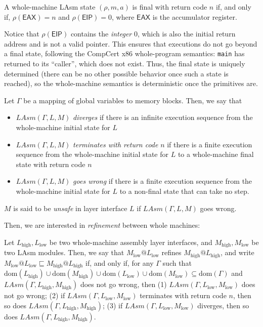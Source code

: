 \begin{definition}
A whole-machine LAsm state $(\rho, m, a)$ is final with return code
$n$ if, and only if, $\rho(\mathsf{EAX}) = n$ and $\rho(\mathsf{EIP}) =
0$, where $\mathsf{EAX}$ is the accumulator register.
\end{definition}

Notice that $\rho(\mathsf{EIP})$ contains the \emph{integer} 0,
which is also the initial return address and is not a valid pointer.
This ensures that executions do not
go beyond a final state, following the CompCert x86 whole-program
semantics: \texttt{main} has returned to its ``caller'', which does
not exist. Thus, the final state is uniquely determined (there can be
no other possible behavior once such a state is reached), so the
whole-machine semantics is deterministic once the primitives are.

\begin{definition}
Let $\Gamma$ be a mapping of global variables to memory blocks. Then, we say that
\begin{itemize}
\item $\mathit{LAsm}(\Gamma, L, M)$ \emph{diverges} if there is an
  infinite execution sequence from the whole-machine initial state for $L$
\item $\mathit{LAsm}(\Gamma, L, M)$ \emph{terminates with return code} $n$ if there is a finite execution sequence from the whole-machine initial state for $L$ to a whole-machine final state with return code $n$
\item $\mathit{LAsm}(\Gamma, L, M)$ \emph{goes wrong} if there is a finite execution sequence from the whole-machine initial state for $L$ to a non-final state that can take no step.
\end{itemize}
$M$ is said to be \emph{unsafe} in layer interface $L$ if $\mathit{LAsm}(\Gamma, L, M)$ goes wrong.
\end{definition}

Then, we are interested in \emph{refinement} between whole machines:
\begin{definition}
Let $L_{\text{high}}, L_{\text{low}}$ be two whole-machine assembly
layer interfaces, and $M_{\text{high}}, M_{\text{low}}$ be two LAsm
modules. Then, we say that $M_{\text{low}} @ L_{\text{low}}$ refines
$M_{\text{high}} @ L_{\text{high}}$, and write $M_{\text{low}} @
L_{\text{low}} \sqsubseteq M_{\text{high}} @ L_{\text{high}}$ if,
and only if, for any $\Gamma$ such that $
\mathrm{dom}(L_{\text{high}}) \cup \mathrm{dom}(M_{\text{high}}) \cup
\mathrm{dom}(L_{\text{low}}) \cup \mathrm{dom}(M_{\text{low}})
\subseteq \mathrm{dom}(\Gamma)$ and $\mathit{LAsm}(\Gamma, L_{\text{high}},
M_{\text{high}})$ does not go wrong, then
(1) $\mathit{LAsm}(\Gamma, L_{\text{low}}, M_{\text{low}})$ does not go wrong;
(2) if $\mathit{LAsm}(\Gamma, L_{\text{low}}, M_{\text{low}})$
  terminates with return code $n$, then so does $\mathit{LAsm}(\Gamma,
  L_{\text{high}}, M_{\text{high}})$;
(3) if $\mathit{LAsm}(\Gamma, L_{\text{low}}, M_{\text{low}})$
  diverges, then so does $\mathit{LAsm}(\Gamma, L_{\text{high}},
  M_{\text{high}})$.
\end{definition}

